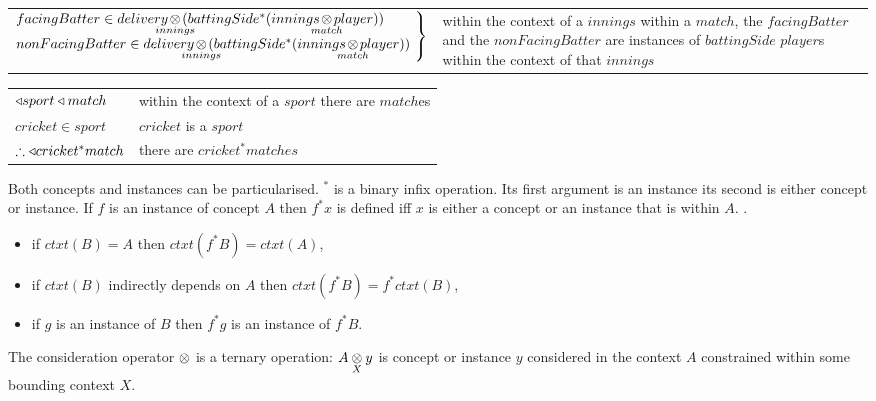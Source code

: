 \documentclass[10pt,a4paper]{article}
\begin{document}
\vspace{1.3cm}


\vspace{1.3cm}


\noindent
\begin{tabular}{l | m{6.5cm}} 
$  \noleft
  {\arraycolsep=0pt
   \begin{array}{l}
facingBatter \in \deliveryCrossBattingSidePlayer \\
nonFacingBatter \in \deliveryCrossBattingSidePlayer 
    \end{array} 
   }
   \ \right\}
  $ & within the context of a $innings$ within a $match$, the $facingBatter$ and the $nonFacingBatter$ 
  are instances of $battingSide$ $player$s within the context of that $innings$ \\
\end{tabular}

\newpage

 \begin{tabular}{l p{5cm}}
$\base sport \base match$            & within the context of a $sport$ there are $match$es      \\
$cricket \in sport$                  & $cricket$ is a $sport$                                   \\
$\therefore \base cricket^*match$    & there are $cricket^*matches$                             \\
\end{tabular}

\mynote
Both concepts and instances can be particularised.
$^*$ is a binary infix operation. Its first argument is an instance its second is either concept or instance.
If $f$ is an instance of concept $A$ then $f^*x$ is defined iff $x$ is either a concept or an instance that is within $A$. 
.

\begin{itemize}
\item if $ctxt(B)=A$ then $ctxt(f^*B)=ctxt(A)$,
\item if $ctxt(B)$ indirectly depends on $A$ then $ctxt(f^*B)=f^*ctxt(B)$,
\item if $g$ is an instance of $B$ then $f^*g$ is an instance of $f^*B$.
\end{itemize}

\mynote 
The consideration operator $\cross$ is a ternary operation:
$\crossx{A}{y}{X}$ is concept or instance $y$ considered in the context $A$ constrained within some bounding context $X$.
\end{document}
